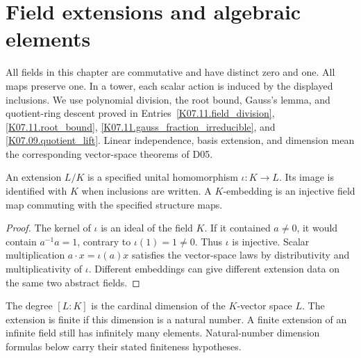 \chapter{Field extensions and algebraic elements}\label{chap:M07.12}
All fields in this chapter are commutative and have distinct zero and one. All maps preserve one. In a tower, each scalar action is induced by the displayed inclusions. We use polynomial division, the root bound, Gauss's lemma, and quotient-ring descent proved in Entries~\ref{K07.11.field_division}, \ref{K07.11.root_bound}, \ref{K07.11.gauss_fraction_irreducible}, and \ref{K07.09.quotient_lift}. Linear independence, basis extension, and dimension mean the corresponding vector-space theorems of D05.

\begin{definition}
An extension $L/K$ is a specified unital homomorphism $\iota:K\to L$. Its image is identified with $K$ when inclusions are written. A $K$-embedding is an injective field map commuting with the specified structure maps.
\end{definition}
\begin{proof}
The kernel of $\iota$ is an ideal of the field $K$. If it contained $a\ne0$, it would contain $a^{-1}a=1$, contrary to $\iota(1)=1\ne0$. Thus $\iota$ is injective. Scalar multiplication $a\cdot x=\iota(a)x$ satisfies the vector-space laws by distributivity and multiplicativity of $\iota$. Different embeddings can give different extension data on the same two abstract fields.
\end{proof}

\begin{definition}
The degree $[L:K]$ is the cardinal dimension of the $K$-vector space $L$. The extension is finite if this dimension is a natural number. A finite extension of an infinite field still has infinitely many elements. Natural-number dimension formulas below carry their stated finiteness hypotheses.
\end{definition}

